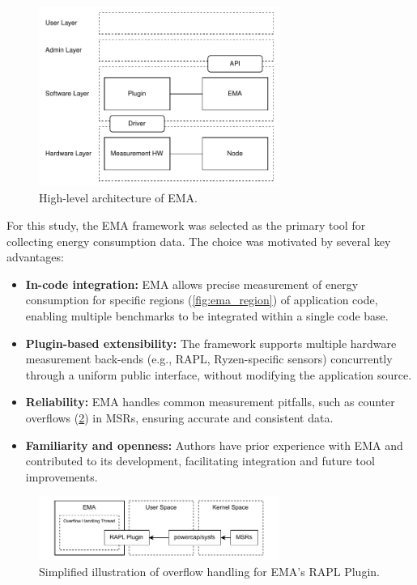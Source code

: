 \begin{figure}[htbp]
    \centering
    \includegraphics[width=0.7\textwidth]{assets/ema_arch}
    \caption{High-level architecture of \gls{EMA}.}
    \label{fig:ema_arch}
\end{figure}

For this study, the \gls{EMA} framework was selected as the primary tool
for collecting energy consumption data. The choice was motivated by several
key advantages:

\begin{itemize}
    \item \textbf{In-code integration:} \gls{EMA} allows precise measurement of
          energy consumption for specific regions (\cref{fig:ema_region}) of application
          code, enabling multiple benchmarks to be integrated within a single code base.
    \item \textbf{Plugin-based extensibility:} The framework supports multiple
          hardware measurement back-ends (e.g., \gls{RAPL}, Ryzen-specific sensors)
          concurrently through a uniform public interface, without modifying
          the application source.
      \item \textbf{Reliability:} \gls{EMA} handles common measurement pitfalls,
          such as counter overflows (\cref{fig:ema_rapl_overflow}) in \gls{MSR}s,
          ensuring accurate and consistent data.
    \item \textbf{Familiarity and openness:} Authors have prior experience with
          \gls{EMA} and contributed to its development, facilitating integration
          and future tool improvements.
\end{itemize}

\begin{figure}[htbp]
    \centering
    \includegraphics[width=0.7\textwidth]{assets/ema_rapl_overflow}
    \caption{Simplified illustration of overflow handling for \gls{EMA}'s \gls{RAPL} Plugin.}
    \label{fig:ema_rapl_overflow}
\end{figure}

